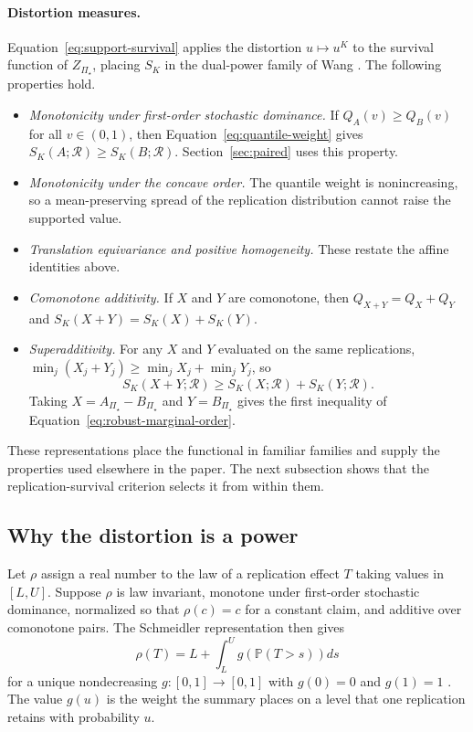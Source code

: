 \documentclass[11pt]{article}
\newcommand{\Regime}{\mathcal{R}}
\newcommand{\PSet}{\Pi_\star}
\newcommand{\Prb}{\mathbb{P}}
\theoremstyle{remark}
\begin{document}
\paragraph{Distortion measures.}
Equation~\eqref{eq:support-survival} applies the distortion $u\mapsto u^{K}$ to the survival function of $Z_{\PSet}$, placing $S_K$ in the dual-power family of Wang \cite{wang1996premium}. The following properties hold.

\begin{itemize}
\item \emph{Monotonicity under first-order stochastic dominance.} If $Q_A(v)\geq Q_B(v)$ for all $v\in(0,1)$, then Equation~\eqref{eq:quantile-weight} gives $S_K(A;\Regime)\geq S_K(B;\Regime)$. Section~\ref{sec:paired} uses this property.
\item \emph{Monotonicity under the concave order.} The quantile weight is nonincreasing, so a mean-preserving spread of the replication distribution cannot raise the supported value.
\item \emph{Translation equivariance and positive homogeneity.} These restate the affine identities above.
\item \emph{Comonotone additivity.} If $X$ and $Y$ are comonotone, then $Q_{X+Y}=Q_X+Q_Y$ and $S_K(X+Y)=S_K(X)+S_K(Y)$.
\item \emph{Superadditivity.} For any $X$ and $Y$ evaluated on the same replications, $\min_j(X_j+Y_j)\geq\min_jX_j+\min_jY_j$, so
\[
S_K(X+Y;\Regime)
\geq
S_K(X;\Regime)+S_K(Y;\Regime).
\]
Taking $X=A_{\PSet}-B_{\PSet}$ and $Y=B_{\PSet}$ gives the first inequality of Equation~\eqref{eq:robust-marginal-order}.
\end{itemize}

These representations place the functional in familiar families and supply the properties used elsewhere in the paper. The next subsection shows that the replication-survival criterion selects it from within them.

\subsection{Why the distortion is a power}
\label{app:characterization}

Let $\rho$ assign a real number to the law of a replication effect $T$ taking values in $[L,U]$. Suppose $\rho$ is law invariant, monotone under first-order stochastic dominance, normalized so that $\rho(c)=c$ for a constant claim, and additive over comonotone pairs. The Schmeidler representation then gives
\begin{equation}
\rho(T)
=
L
+
\int_L^U
g\left(\Prb(T>s)\right)
ds
\label{eq:distortion-representation}
\end{equation}
for a unique nondecreasing $g:[0,1]\to[0,1]$ with $g(0)=0$ and $g(1)=1$ \cite{schmeidler1986integral,yaari1987dual}. The value $g(u)$ is the weight the summary places on a level that one replication retains with probability $u$.
\end{document}
